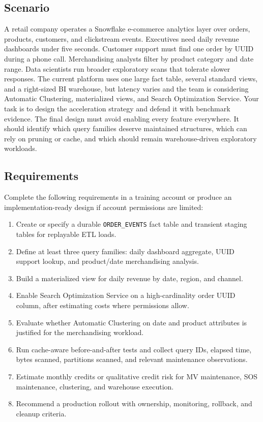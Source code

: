 \subsection*{Scenario}
A retail company operates a Snowflake e-commerce analytics layer over orders, products, customers, and clickstream events. Executives need daily revenue dashboards under five seconds. Customer support must find one order by UUID during a phone call. Merchandising analysts filter by product category and date range. Data scientists run broader exploratory scans that tolerate slower responses. The current platform uses one large fact table, several standard views, and a right-sized BI warehouse, but latency varies and the team is considering Automatic Clustering, materialized views, and Search Optimization Service.
Your task is to design the acceleration strategy and defend it with benchmark evidence. The final design must avoid enabling every feature everywhere. It should identify which query families deserve maintained structures, which can rely on pruning or cache, and which should remain warehouse-driven exploratory workloads.
\subsection*{Requirements}
Complete the following requirements in a training account or produce an implementation-ready design if account permissions are limited:
\begin{enumerate}
    \item Create or specify a durable \texttt{ORDER\_EVENTS} fact table and transient staging tables for replayable ETL loads.
    \item Define at least three query families: daily dashboard aggregate, UUID support lookup, and product/date merchandising analysis.
    \item Build a materialized view for daily revenue by date, region, and channel.
    \item Enable Search Optimization Service on a high-cardinality order UUID column, after estimating costs where permissions allow.
    \item Evaluate whether Automatic Clustering on date and product attributes is justified for the merchandising workload.
    \item Run cache-aware before-and-after tests and collect query IDs, elapsed time, bytes scanned, partitions scanned, and relevant maintenance observations.
    \item Estimate monthly credits or qualitative credit risk for MV maintenance, SOS maintenance, clustering, and warehouse execution.
    \item Recommend a production rollout with ownership, monitoring, rollback, and cleanup criteria.
\end{enumerate}
